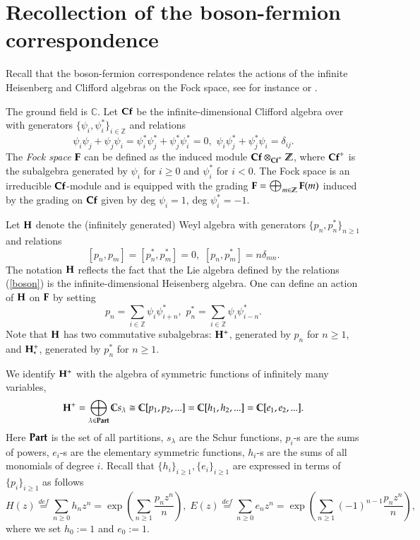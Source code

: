 \documentclass[11pt]{amsart}
\begin{document}
\section {Recollection of the boson-fermion correspondence}

Recall that the
boson-fermion correspondence relates the actions of the
infinite Heisenberg and Clifford algebras on the Fock space, see for instance \cite{F}
or \cite{DJKM}. 

The ground field is $\mathbb C$.
Let $\bold{Cf}$ be the infinite-dimensional Clifford algebra over
with generators
$\{\psi_i,\psi^*_i\}_{i\in\mathbb Z}$ and relations 
\begin{equation}\label{clifford}
\psi_i\psi_j+\psi_j\psi_i=\psi^*_i\psi^*_j+\psi^*_j\psi^*_i=0,\,\,\psi_i\psi^*_j+\psi^*_j\psi_i=\delta_{ij}.
\end{equation}
The {\it Fock space} $\bold{F}$ can be defined as the induced module
$\bold{Cf}\otimes_{\bold{Cf}^+}\mathbb Z$, where $\bold{Cf}^+$ is the subalgebra generated
by $\psi_i$ for $i\geq 0$ and $\psi^*_i$ for $i<0$. The Fock space  is an
irreducible $\bold{Cf}$-module and is equipped with the grading
$\bold{F}=\bigoplus_{m\in\mathbb Z}\bold{F}(m)$ induced by the grading on
$\bold{Cf}$ given by deg $\psi_i=1$, deg $\psi_i^*=-1$.

Let $\bold {H}$ denote the (infinitely generated) Weyl algebra
with generators $\{p_n,p^*_n\}_{n\geq 1}$ and relations
\begin{equation}\label{boson}
[p_n,p_m]=[p_n^*,p_m^*]=0,\,\,[p_n,p^*_m]=n\delta_{mn}.
\end{equation}
The notation $\bold {H}$ reflects the fact that the Lie algebra defined by the relations (\ref{boson}) is the infinite-dimensional
Heisenberg algebra.
One can define an action of  $\bold {H}$ on $\bold{F}$ by setting 
$$p_n=\sum_{i\in \mathbb Z}\psi_i\psi^*_{i+n},\,\,p^*_n=\sum_{i\in \mathbb Z}\psi_i\psi^*_{i-n}.$$
Note that $\bold{H}$ has two commutative subalgebras: 
$\bold {H}^+$, generated by $p_n$ for $n\geq 1$, and $\bold {H}^+_*$, generated by $p_n^*$ for $n\geq 1$.


We identify $\bold{H}^+$ with the algebra  
of symmetric functions of infinitely many variables,
$$\bold{H}^+=\bigoplus_{\lambda\in\bold{Part}}\mathbb{C} s_\lambda\cong\mathbb{C}[p_1,p_2,...]=\mathbb{C}[h_1,h_2,...]=\mathbb{C}[e_1,e_2,...].$$
Here $\bold{Part}$ is the set of all partitions, $s_\lambda$ are the
Schur functions, $p_i$-s are the sums of powers, $e_i$-s are the
elementary symmetric functions, $h_i$-s are the sums of all monomials of
degree $i$. Recall  \cite{M} that $\{h_i\}_{i\geq 1},\{e_i\}_{i\geq 1}$ 
are expressed in terms of  $\{p_i\}_{i\geq 1}$ as follows
\begin{equation}\label{symid}
H(z)\stackrel{def}{=}\sum_{n\geq 0}h_n z^n=\exp\left(\sum_{n\geq 1}\frac{p_n z^n}{n}\right),\;
E(z)\stackrel{def}{=}\sum_{n\geq 0}e_n z^n=\exp\left(\sum_{n\geq  1}(-1)^{n-1}\frac{p_n z^n}{n}\right),
\end{equation}
where we set $h_0:=1$ and $e_0:=1$. 
\end{document}
